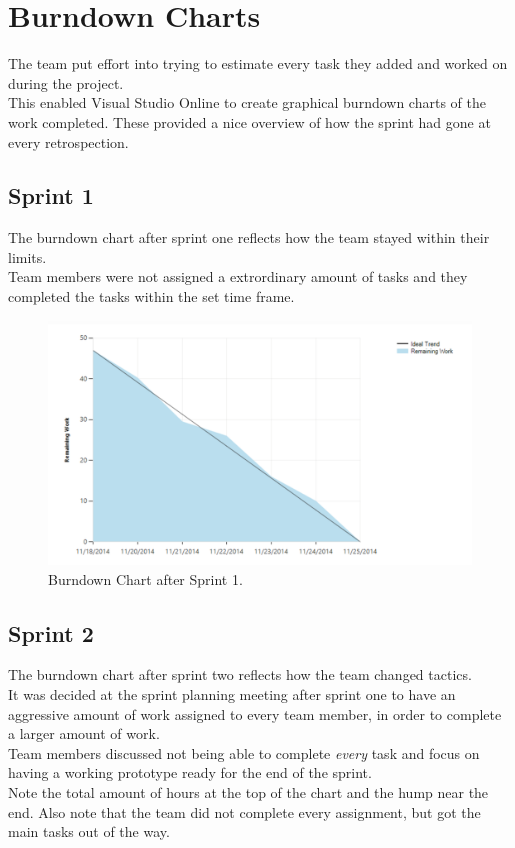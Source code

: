 \section{Burndown Charts}
The team put effort into trying to estimate every task they added and worked on during the project.\\
This enabled Visual Studio Online to create graphical burndown charts of the work completed. These provided a nice overview of how the sprint had gone at every retrospection.

\subsection{Sprint 1}
The burndown chart after sprint one reflects how the team stayed within their limits. \\
Team members were not assigned a extrordinary amount of tasks and they completed the tasks within the set time frame.

\begin{figure}[H]
	\centering
	\includegraphics[scale=0.40]{Figures/Burndown1}
	\caption{Burndown Chart after Sprint 1.}
\end{figure}

\subsection{Sprint 2}
The burndown chart after sprint two reflects how the team changed tactics. \\
It was decided at the sprint planning meeting after sprint one to have an aggressive amount of work assigned to every team member, in order to complete a larger amount of work. \\
Team members discussed not being able to complete \textit{every} task and focus on having a working prototype ready for the end of the sprint.\\
Note the total amount of hours at the top of the chart and the hump near the end. Also note that the team did not complete every assignment, but got the main tasks out of the way.

